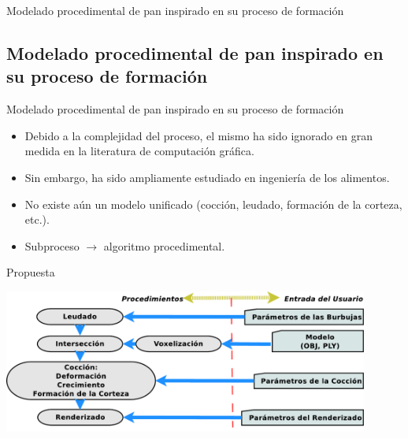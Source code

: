 \documentclass[spanish,unknownkeysallowed]{beamer}
\begin{document}
\begin{frame}
\begin{block}{}
\begin{center}
\vspace{1cm}
\huge{Modelado procedimental de pan inspirado en su proceso de formación}
\vspace{1cm}
\end{center}
\end{block}
\end{frame}

\subsection{Modelado procedimental de pan inspirado en su proceso de formación}
\begin{frame}{Modelado procedimental de pan inspirado en su proceso de formación}
\begin{block}{}
\begin{itemize}
\item Debido a la complejidad del proceso, el mismo ha sido ignorado en gran medida en la literatura de computación gráfica.

\item Sin embargo, ha sido ampliamente estudiado en ingeniería de los alimentos.

\item No existe aún un modelo unificado (cocción, leudado, formación de la corteza, etc.).

\item Subproceso $\rightarrow$ algoritmo procedimental.
\end{itemize}
\end{block}
\end{frame}

\begin{frame}{Propuesta}
\centerline{\includegraphics[width=12cm]{../figures/pipeline}}
\end{frame}
\end{document}

